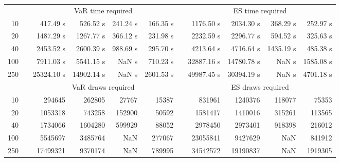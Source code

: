 {{\begin{longtable}{rr rrrr r rrrr}
\hline 
 & & \multicolumn{4}{c}{VaR time required} && \multicolumn{4}{c}{ES time required} \\ \cline{3-6}  \cline{8-11}
10 & & 417.49 s & 526.52 s & 241.24 s & 166.35 s && 1176.50 s & 2034.30 s & 368.29 s & 252.97 s \\ 
20 & & 1487.29 s & 1267.77 s & 366.12 s & 231.98 s && 2232.59 s & 2296.77 s & 594.52 s & 325.63 s \\ 
40 & & 2453.52 s & 2600.39 s & 988.69 s & 295.70 s && 4213.64 s & 4716.64 s & 1435.19 s & 485.38 s \\ 
100 & & 7911.03 s & 5541.15 s &  NaN s & 710.23 s && 32887.16 s & 14780.78 s &  NaN s & 1585.08 s \\ 
250 & & 25324.10 s & 14902.14 s &  NaN s & 2601.53 s && 49987.45 s & 30394.19 s &  NaN s & 4701.18 s \\ 
\hline 
 && \multicolumn{4}{c}{VaR draws required} &&   \multicolumn{4}{c}{ES draws required} \\  \cline{3-6}  \cline{8-11} 
10 & & 294645 & 262805 & 27767 & 15387 && 831961 & 1240376 & 118077  & 75353 \\ 
20 & & 1053318 & 743258 & 152900 & 50592 && 1581417 & 1410016 & 315261  & 113565 \\ 
40 & & 1734066 & 1604280 & 599929 & 88052 && 2978450 & 2973401 & 918398  & 216012 \\ 
100 & & 5545697 & 3485764 & NaN & 277067 && 23055841 & 9427629 & NaN  & 841912 \\ 
250 & & 17499321 & 9370174 & NaN & 789995 && 34542572 & 19190837 & NaN  & 1919305 \\ 
\hline 
\end{longtable} 
} 
} 
